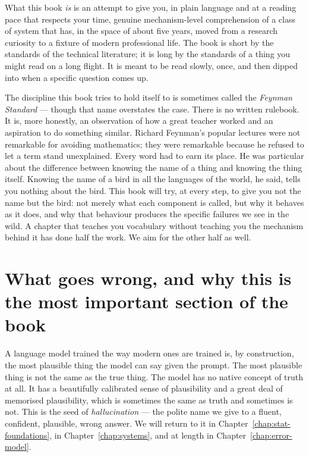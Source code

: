 What this book \emph{is} is an attempt to give you, in plain
language and at a reading pace that respects your time, genuine
mechanism-level comprehension of a class of system that has, in
the space of about five years, moved from a research curiosity to
a fixture of modern professional life. The book is short by the
standards of the technical literature; it is long by the standards
of a thing you might read on a long flight. It is meant to be read
slowly, once, and then dipped into when a specific question comes up.

The discipline this book tries to hold itself to is sometimes
called the \emph{Feynman Standard} --- though that name
overstates the case. There is no written rulebook. It is, more
honestly, an observation of how a great teacher worked and an
aspiration to do something similar. Richard Feynman's popular
lectures were not remarkable for avoiding mathematics; they were
remarkable because he refused to let a term stand unexplained.
Every word had to earn its place. He was particular about the
difference between knowing the name of a thing and knowing the
thing itself. Knowing the name of a bird in all the languages of
the world, he said, tells you nothing about the bird. This book
will try, at every step, to give you not the name but the bird:
not merely what each component is called, but why it behaves as
it does, and why that behaviour produces the specific failures
we see in the wild. A chapter that teaches you vocabulary without
teaching you the mechanism behind it has done half the work. We
aim for the other half as well.

\section*{What goes wrong, and why this is the most important section
of the book}

A language model trained the way modern ones are trained is, by
construction, the most plausible thing the model can say given
the prompt. The most plausible thing is not the same as the true
thing. The model has no native concept of truth at all. It has a
beautifully calibrated sense of plausibility and a great deal of
memorised plausibility, which is sometimes the same as truth and
sometimes is not. This is the seed of \emph{hallucination} --- the
polite name we give to a fluent, confident, plausible, wrong
answer. We will return to it in Chapter~\ref{chap:stat-foundations}, in Chapter~\ref{chap:systems}, and at
length in Chapter~\ref{chap:error-model}.

